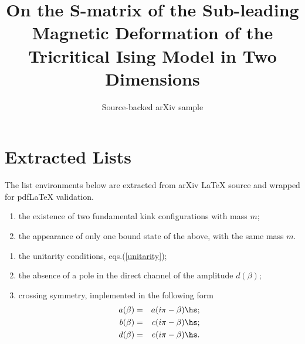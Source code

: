 \documentclass[11pt]{article}
\title{On the S-matrix of the Sub-leading Magnetic Deformation of the
  Tricritical Ising Model in Two Dimensions}
\author{Source-backed arXiv sample}
\date{}
\begin{document}
\maketitle
\section{Extracted Lists}

The list environments below are extracted from arXiv LaTeX source and wrapped for pdfLaTeX validation.

\begin{enumerate}
\item the existence of two fundamental kink configurations with mass
$m$;
\item the appearance of only one bound state of the above, with the same mass
$m$.
\end{enumerate}

\begin{enumerate}
\item the unitarity conditions, eqs.(\ref{unitarity});
\item the absence of a pole in the direct channel of the amplitude
$d(\beta)$;
\item crossing symmetry, implemented in the following form
\begin{eqnarray}
a(\beta) & = & a(i\pi -\beta) \hs ;\nonumber \\
b(\beta) & = & c(i\pi -\beta) \hs ;\label{cross2}\\
d(\beta) & = & e(i\pi -\beta) \hs .\nonumber
\end{eqnarray}
\end{enumerate}
\end{document}
